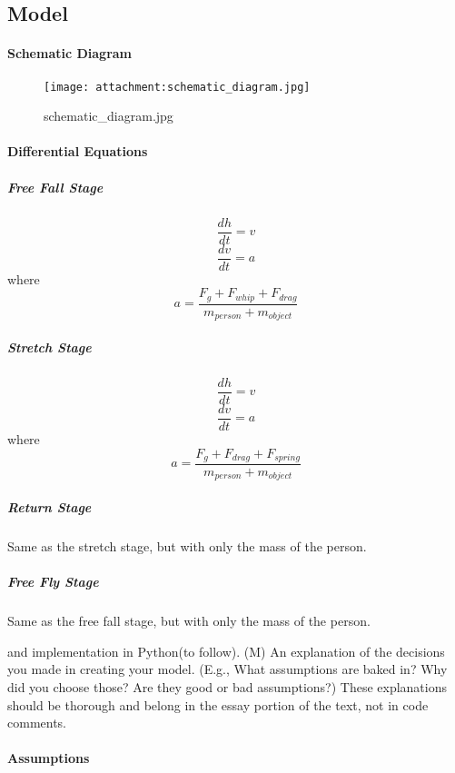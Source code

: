 \documentclass[11pt]{article}
\makeatletter
\def\maxwidth{\ifdim\Gin@nat@width>\linewidth\linewidth
    \else\Gin@nat@width\fi}
\let\Oldincludegraphics\includegraphics
\renewcommand{\includegraphics}[1]{\Oldincludegraphics[width=.8\maxwidth]{#1}}
\makeatother
\begin{document}
    \hypertarget{model}{%
\subsection{Model}\label{model}}

\hypertarget{schematic-diagram}{%
\paragraph{Schematic Diagram}\label{schematic-diagram}}

\begin{figure}
\centering
\texttt{[image: attachment:schematic\_diagram.jpg]}
\caption{schematic\_diagram.jpg}
\end{figure}

\hypertarget{differential-equations}{%
\paragraph{Differential Equations}\label{differential-equations}}

\hypertarget{free-fall-stage}{%
\subparagraph{Free Fall Stage}\label{free-fall-stage}}

\[\frac{dh}{dt} = v \] \[\frac{dv}{dt} = a \] where
\[a = \frac{F_g + F_{whip} + F_{drag}}{m_{person} + m_{object}}\]

\hypertarget{stretch-stage}{%
\subparagraph{Stretch Stage}\label{stretch-stage}}

\[\frac{dh}{dt} = v \] \[\frac{dv}{dt} = a \] where
\[a = \frac{F_g + F_{drag} + F_{spring}}{m_{person} + m_{object}}\]

\hypertarget{return-stage}{%
\subparagraph{Return Stage}\label{return-stage}}

Same as the stretch stage, but with only the mass of the person.

\hypertarget{free-fly-stage}{%
\subparagraph{Free Fly Stage}\label{free-fly-stage}}

Same as the free fall stage, but with only the mass of the person.

and implementation in Python(to follow). (M) An explanation of the
decisions you made in creating your model. (E.g., What assumptions are
baked in? Why did you choose those? Are they good or bad assumptions?)
These explanations should be thorough and belong in the essay portion of
the text, not in code comments.

    \hypertarget{assumptions}{%
\paragraph{Assumptions}\label{assumptions}}
\end{document}
